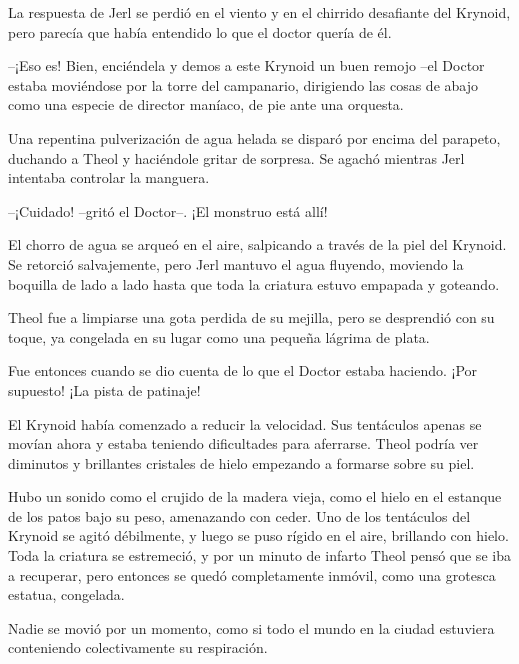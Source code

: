 La respuesta de Jerl se perdió en el viento y en el chirrido desafiante del Krynoid, pero parecía que había entendido lo que el doctor quería de él.



--¡Eso es! Bien, enciéndela y demos a este Krynoid un buen remojo --el Doctor estaba moviéndose por la torre del campanario, dirigiendo las cosas de abajo como una especie de director maníaco, de pie ante una orquesta.



Una repentina pulverización de agua helada se disparó por encima del parapeto, duchando a Theol y haciéndole gritar de sorpresa. Se agachó mientras Jerl intentaba controlar la manguera.



--¡Cuidado! --gritó el Doctor--. ¡El monstruo está allí!



El chorro de agua se arqueó en el aire, salpicando a través de la piel del Krynoid. Se retorció salvajemente, pero Jerl mantuvo el agua fluyendo, moviendo la boquilla de lado a lado hasta que toda la criatura estuvo empapada y goteando.



Theol fue a limpiarse una gota perdida de su mejilla, pero se desprendió con su toque, ya congelada en su lugar como una pequeña lágrima de plata.



Fue entonces cuando se dio cuenta de lo que el Doctor estaba haciendo. ¡Por supuesto! ¡La pista de patinaje!



El Krynoid había comenzado a reducir la velocidad. Sus tentáculos apenas se movían ahora y estaba teniendo dificultades para aferrarse. Theol podría ver diminutos y brillantes cristales de hielo empezando a formarse sobre su piel.



Hubo un sonido como el crujido de la madera vieja, como el hielo en el estanque de los patos bajo su peso, amenazando con ceder. Uno de los tentáculos del Krynoid se agitó débilmente, y luego se puso rígido en el aire, brillando con hielo. Toda la criatura se estremeció, y por un minuto de infarto Theol pensó que se iba a recuperar, pero entonces se quedó completamente inmóvil, como una grotesca estatua, congelada.



Nadie se movió por un momento, como si todo el mundo en la ciudad estuviera conteniendo colectivamente su respiración.



